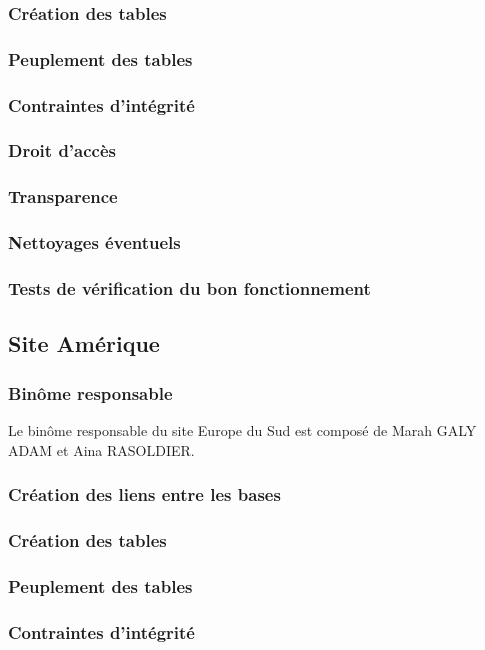 \documentclass[10pt,a4paper,twoside]{article}
\begin{document}
\subsubsection{Création des tables}
\subsubsection{Peuplement des tables}
\subsubsection{Contraintes d'intégrité}
\subsubsection{Droit d'accès}
\subsubsection{Transparence}
\subsubsection{Nettoyages éventuels}
\subsubsection{Tests de vérification du bon fonctionnement}

\subsection{Site Amérique}
\subsubsection{Binôme responsable}
Le binôme responsable du site Europe du Sud est composé de Marah GALY ADAM et Aina RASOLDIER.
\subsubsection{Création des liens entre les bases}
\subsubsection{Création des tables}
\subsubsection{Peuplement des tables}
\subsubsection{Contraintes d'intégrité}
\end{document}
